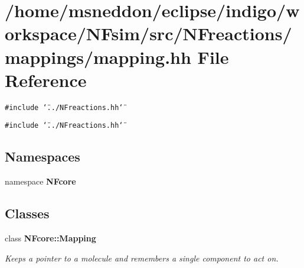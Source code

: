 \section{/home/msneddon/eclipse/indigo/workspace/NFsim/src/NFreactions/mappings/mapping.hh File Reference}
\label{mapping_8hh}


{\tt \#include \char`\"{}../NFreactions.hh\char`\"{}}\par
{\tt \#include \char`\"{}../NFreactions.hh\char`\"{}}\par
\subsection*{Namespaces}
\begin{CompactItemize}
\item 
namespace {\bf NFcore}
\end{CompactItemize}
\subsection*{Classes}
\begin{CompactItemize}
\item 
class {\bf NFcore::Mapping}
\begin{CompactList}\small\item\em Keeps a pointer to a molecule and remembers a single component to act on. \item\end{CompactList}\end{CompactItemize}

